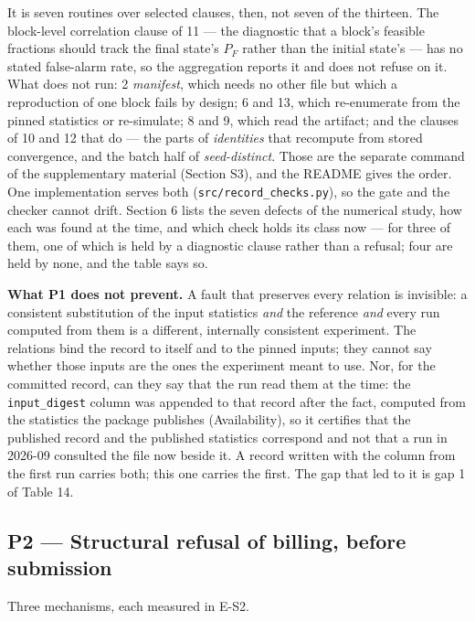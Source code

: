 \documentclass[acmsmall,screen,review]{acmart}
\begin{document}
It is seven routines over selected clauses, then, not seven of the thirteen. The block-level correlation clause of 11 --- the diagnostic that a block's feasible fractions should track the final state's $P_{F}$ rather than the initial state's --- has no stated false-alarm rate, so the aggregation reports it and does not refuse on it. What does not run: 2 \textit{manifest}, which needs no other file but which a reproduction of one block fails by design; 6 and 13, which re-enumerate from the pinned statistics or re-simulate; 8 and 9, which read the artifact; and the clauses of 10 and 12 that do --- the parts of \textit{identities} that recompute from stored convergence, and the batch half of \textit{seed-distinct}. Those are the separate command of the supplementary material (Section S3), and the README gives the order. One implementation serves both (\texttt{src/\allowbreak{}record\_\allowbreak{}checks.\allowbreak{}py}), so the gate and the checker cannot drift. Section 6 lists the seven defects of the numerical study, how each was found at the time, and which check holds its class now --- for three of them, one of which is held by a diagnostic clause rather than a refusal; four are held by none, and the table says so.


\textbf{What P1 does not prevent.} A fault that preserves every relation is invisible: a consistent substitution of the input statistics \textit{and} the reference \textit{and} every run computed from them is a different, internally consistent experiment. The relations bind the record to itself and to the pinned inputs; they cannot say whether those inputs are the ones the experiment meant to use. Nor, for the committed record, can they say that the run read them at the time: the \texttt{input\_digest} column was appended to that record after the fact, computed from the statistics the package publishes (Availability), so it certifies that the published record and the published statistics correspond and not that a run in 2026-09 consulted the file now beside it. A record written with the column from the first run carries both; this one carries the first. The gap that led to it is gap 1 of Table 14.


\subsection{P2 --- Structural refusal of billing, before submission}

Three mechanisms, each measured in E-S2.
\end{document}
